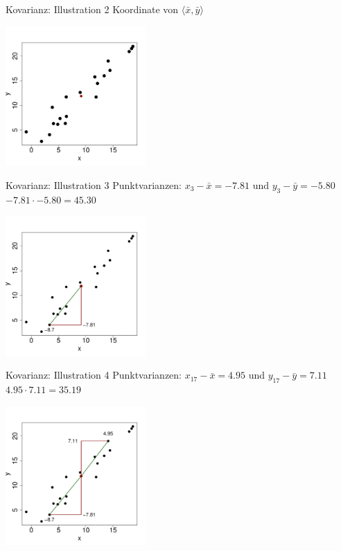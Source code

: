\begin{frame}
  {Kovarianz: Illustration 2}
  Koordinate von $\langle\bar{x},\bar{y}\rangle$
  \begin{center}
    \includegraphics[width=0.4\textwidth]{graphics/cov02}
  \end{center}
\end{frame}


\begin{frame}
  {Kovarianz: Illustration 3}
  Punktvarianzen: $x_3-\bar{x}=-7.81$ und $y_3-\bar{y}=-5.80$\\
  \alert{$-7.81\cdot-5.80=45.30$}
  \begin{center}
    \includegraphics[width=0.4\textwidth]{graphics/cov03}
  \end{center}
\end{frame}


\begin{frame}
  {Kovarianz: Illustration 4}
  Punktvarianzen: $x_{17}-\bar{x}=4.95$ und $y_{17}-\bar{y}=7.11$\\
  \alert{$4.95\cdot7.11=35.19$}
  \begin{center}
    \includegraphics[width=0.4\textwidth]{graphics/cov04}
  \end{center}
\end{frame}


